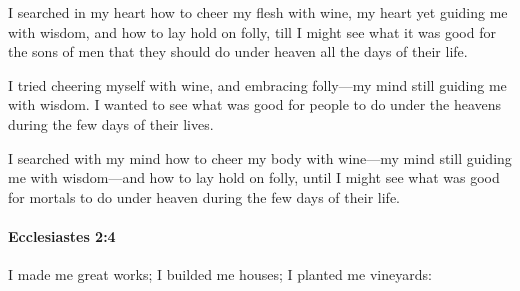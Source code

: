 			\begin{versebox}
					\item[BHS] 
					\item[LXX] 
					\item[ASV] I searched in my heart how to cheer my flesh with wine, my heart yet guiding me with wisdom, and how to lay hold on folly, till I might see what it was good for the sons of men that they should do under heaven all the days of their life.
					\item[NIV] I tried cheering myself with wine, and embracing folly—my mind still guiding me with wisdom. I wanted to see what was good for people to do under the heavens during the few days of their lives.
					\item[NRSV] I searched with my mind how to cheer my body with wine—my mind still guiding me with wisdom—and how to lay hold on folly, until I might see what was good for mortals to do under heaven during the few days of their life.
			\end{versebox}

		\paragraph{Ecclesiastes 2:4} %
			\label{ECCLESIASTES-2-4}

			I made me great works; I builded me houses; I planted me vineyards:

